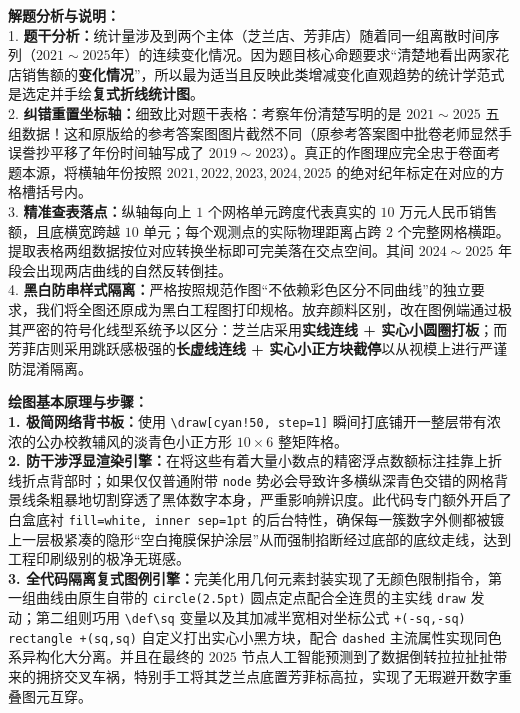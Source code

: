 \documentclass[12pt, a4paper]{ctexrep}
\begin{document}
{\small\color{gray}
\textbf{解题分析与说明：}\\
1. \textbf{题干分析：}统计量涉及到两个主体（芝兰店、芳菲店）随着同一组离散时间序列（$2021\sim 2025$年）的连续变化情况。因为题目核心命题要求“清楚地看出两家花店销售额的\textbf{变化情况}”，所以最为适当且反映此类增减变化直观趋势的统计学范式是选定并手绘\textbf{复式折线统计图}。\\
2. \textbf{纠错重置坐标轴：}细致比对题干表格：考察年份清楚写明的是 $2021\sim 2025$ 五组数据！这和原版给的参考答案图图片截然不同（原参考答案图中批卷老师显然手误誊抄平移了年份时间轴写成了 $2019\sim 2023$）。真正的作图理应完全忠于卷面考题本源，将横轴年份按照 $2021, 2022, 2023, 2024, 2025$ 的绝对纪年标定在对应的方格槽括号内。\\
3. \textbf{精准查表落点：}纵轴每向上 $1$ 个网格单元跨度代表真实的 $10$ 万元人民币销售额，且底横宽跨越 $10$ 单元；每个观测点的实际物理距离占跨 $2$ 个完整网格横距。提取表格两组数据按位对应转换坐标即可完美落在交点空间。其间 $2024\sim 2025$ 年段会出现两店曲线的自然反转倒挂。\\
4. \textbf{黑白防串样式隔离：}严格按照规范作图“不依赖彩色区分不同曲线”的独立要求，我们将全图还原成为黑白工程图打印规格。放弃颜料区别，改在图例端通过极其严密的符号化线型系统予以区分：芝兰店采用\textbf{实线连线 + 实心小圆圈打板}；而芳菲店则采用跳跃感极强的\textbf{长虚线连线 + 实心小正方块截停}以从视模上进行严谨防混淆隔离。
}

\vspace{0.6cm}

{\small\color{blue!70!black}
\textbf{绘图基本原理与步骤：}\\
\textbf{1. 极简网络背书板：}使用 \texttt{\textbackslash draw[cyan!50, step=1]} 瞬间打底铺开一整层带有浓浓的公办校教辅风的淡青色小正方形 $10\times 6$ 整矩阵格。\\
\textbf{2. 防干涉浮显渲染引擎：}在将这些有着大量小数点的精密浮点数额标注挂靠上折线折点背部时；如果仅仅普通附带 \texttt{node} 势必会导致许多横纵深青色交错的网格背景线条粗暴地切割穿透了黑体数字本身，严重影响辨识度。此代码专门额外开启了白盒底衬 \texttt{fill=white, inner sep=1pt} 的后台特性，确保每一簇数字外侧都被镀上一层极紧凑的隐形“空白掩膜保护涂层”从而强制掐断经过底部的底纹走线，达到工程印刷级别的极净无斑感。\\
\textbf{3. 全代码隔离复式图例引擎：}完美化用几何元素封装实现了无颜色限制指令，第一组曲线由原生自带的 \texttt{circle(2.5pt)} 圆点定点配合全连贯的主实线 \texttt{draw} 发动；第二组则巧用 \texttt{\textbackslash def\textbackslash sq} 变量以及其加减半宽相对坐标公式 \texttt{+(-sq,-sq) rectangle +(sq,sq)} 自定义打出实心小黑方块，配合 \texttt{dashed} 主流属性实现同色系异构化大分离。并且在最终的 $2025$ 节点人工智能预测到了数据倒转拉拉扯扯带来的拥挤交叉车祸，特别手工将其芝兰点底置芳菲标高拉，实现了无瑕避开数字重叠图元互穿。
}
\end{document}

